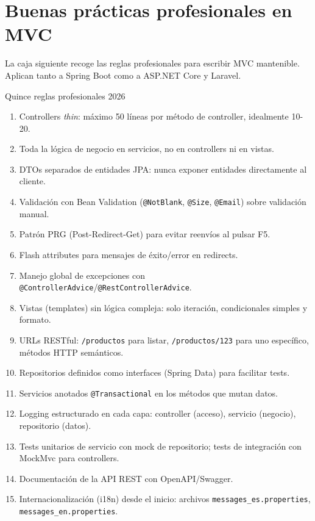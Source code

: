 \section{Buenas prácticas profesionales en MVC}

La caja siguiente recoge las reglas profesionales para
escribir MVC mantenible. Aplican tanto a Spring Boot como a
ASP.NET Core y Laravel.


\begin{cajabuenas}{Quince reglas profesionales 2026}
\begin{enumerate}
\item Controllers \emph{thin}: máximo 50 líneas por método de
controller, idealmente 10-20.
\item Toda la lógica de negocio en servicios, no en controllers ni
en vistas.
\item DTOs separados de entidades JPA: nunca exponer entidades
directamente al cliente.
\item Validación con Bean Validation (\texttt{@NotBlank},
\texttt{@Size}, \texttt{@Email}) sobre validación manual.
\item Patrón PRG (Post-Redirect-Get) para evitar reenvíos al pulsar
F5.
\item Flash attributes para mensajes de éxito/error en redirects.
\item Manejo global de excepciones con
\texttt{@ControllerAdvice}/\texttt{@RestControllerAdvice}.
\item Vistas (templates) sin lógica compleja: solo iteración,
condicionales simples y formato.
\item URLs RESTful: \texttt{/productos} para listar, \texttt{/productos/123}
para uno específico, métodos HTTP semánticos.
\item Repositorios definidos como interfaces (Spring Data) para
facilitar tests.
\item Servicios anotados \texttt{@Transactional} en los métodos que
mutan datos.
\item Logging estructurado en cada capa: controller (acceso),
servicio (negocio), repositorio (datos).
\item Tests unitarios de servicio con mock de repositorio; tests de
integración con MockMvc para controllers.
\item Documentación de la API REST con OpenAPI/Swagger.
\item Internacionalización (i18n) desde el inicio: archivos
\texttt{messages\_es.properties}, \texttt{messages\_en.properties}.
\end{enumerate}
\end{cajabuenas}

